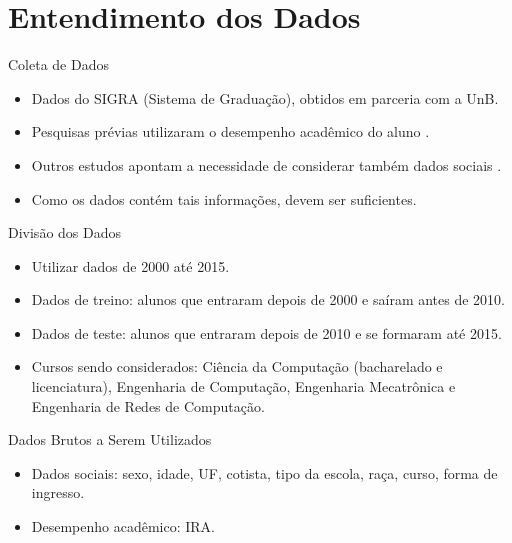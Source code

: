 \section{Entendimento dos Dados}

\begin{frame}{Coleta de Dados}
    \begin{itemize}[itemsep=3ex]
        \item Dados do SIGRA (Sistema de Graduação), obtidos em parceria com a UnB.
        \item Pesquisas prévias utilizaram o desempenho acadêmico do aluno
            \cite{adeodato}.
        \item Outros estudos apontam a necessidade de considerar também dados sociais
            \cite{predict_retention}.
        \item Como os dados contém tais informações, devem ser suficientes.
    \end{itemize}
\end{frame}

\begin{frame}{Divisão dos Dados}
    \begin{itemize}[itemsep=3ex]
        \item Utilizar dados de 2000 até 2015. 
        \item Dados de treino: alunos que entraram depois de 2000 e saíram antes de
            2010.
        \item Dados de teste: alunos que entraram depois de 2010 e se formaram até
            2015.
        \item Cursos sendo considerados: Ciência da Computação (bacharelado e
            licenciatura), Engenharia de Computação, Engenharia Mecatrônica e
            Engenharia de Redes de Computação. 
    \end{itemize}
\end{frame}

\begin{frame}{Dados Brutos a Serem Utilizados}
    \begin{itemize}[itemsep=3ex]
        \item Dados sociais: sexo, idade, UF, cotista,
            tipo da escola, raça, curso, forma de ingresso.
        \item Desempenho acadêmico: IRA.
    \end{itemize}
\end{frame}

